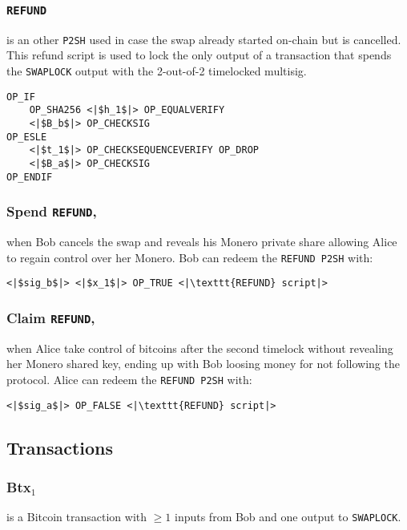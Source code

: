 \documentclass{llncs}
\begin{document}
\subsubsection{\texttt{REFUND}}
is an other \texttt{P2SH} used in case the swap already started on-chain but is cancelled. This refund script is used to lock the only output of a transaction that spends the \texttt{SWAPLOCK} output with the 2-out-of-2 timelocked multisig.

\begin{verbatim}
OP_IF
    OP_SHA256 <|$h_1$|> OP_EQUALVERIFY
    <|$B_b$|> OP_CHECKSIG
OP_ESLE
    <|$t_1$|> OP_CHECKSEQUENCEVERIFY OP_DROP
    <|$B_a$|> OP_CHECKSIG
OP_ENDIF
\end{verbatim}

\subsubsection{Spend \texttt{REFUND},}
when Bob cancels the swap and reveals his Monero private share allowing Alice to regain control over her Monero. Bob can redeem the \texttt{REFUND P2SH} with:

\begin{verbatim}
<|$sig_b$|> <|$x_1$|> OP_TRUE <|\texttt{REFUND} script|>
\end{verbatim}

\subsubsection{Claim \texttt{REFUND},}
when Alice take control of bitcoins after the second timelock without revealing her Monero shared key, ending up with Bob loosing money for not following the protocol. Alice can redeem the \texttt{REFUND P2SH} with:

\begin{verbatim}
<|$sig_a$|> OP_FALSE <|\texttt{REFUND} script|>
\end{verbatim}

\subsection{Transactions}
\subsubsection{Btx$_1$}
is a Bitcoin transaction with $\geq 1$ inputs from Bob and one output to \texttt{SWAPLOCK}.
\end{document}
